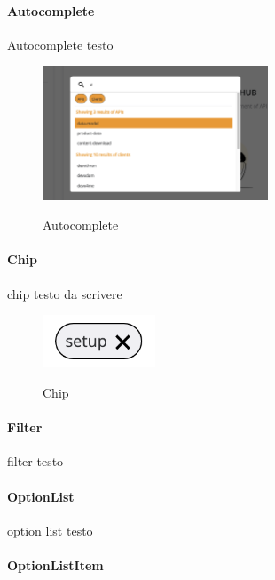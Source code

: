 \paragraph{Autocomplete}\label{par:autocomplete}

Autocomplete testo

\begin{figure}[ht]
  \centering
  \includegraphics[width=0.6\textwidth, alt={Componente che si occupa della lista dinamica di risultati}]{images/frontend/SearchBar2.jpg}
  \caption{Autocomplete}\label{fig:autocomplete}
\end{figure}

\paragraph{Chip}\label{par:chip}

chip testo da scrivere

\begin{figure}[ht]
  \centering
  \includegraphics[width=0.3\textwidth, alt={Chip contenente il client id corrente}]{images/frontend/Chip.jpg}
  \caption{Chip}\label{fig:chip}
\end{figure}

\paragraph{Filter}\label{par:filter}

filter testo

\paragraph{OptionList}\label{par:option-list}

option list testo

\paragraph{OptionListItem}\label{par:option-list-item}

